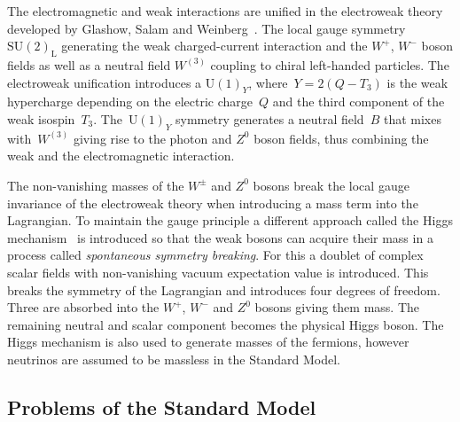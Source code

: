The electromagnetic and weak interactions are unified in the electroweak theory
developed by Glashow, Salam and Weinberg~\cite{glashow, salam, weinberg}. The
local gauge symmetry~$\mathrm{SU}(2)_\text{L}$ generating the weak
charged-current interaction and the $W^+$, $W^-$ boson fields as well as a
neutral field $W^{(3)}$ coupling to chiral left-handed particles. The
electroweak unification introduces a $\mathrm{U}(1)_Y$, where~$Y = 2 (Q - T_3)$
is the weak hypercharge depending on the electric charge~$Q$ and the third
component of the weak isospin~$T_3$. The~$\mathrm{U}(1)_Y$ symmetry generates a
neutral field~$B$ that mixes with~$W^{(3)}$ giving rise to the photon and $Z^0$
boson fields, thus combining the weak and the electromagnetic interaction.

The non-vanishing masses of the $W^\pm$ and $Z^0$ bosons break the local gauge
invariance of the electroweak theory when introducing a mass term into the
Lagrangian. To maintain the gauge principle a different approach called the
Higgs mechanism~\cite{englert_brout, higgs} is introduced so that the weak
bosons can acquire their mass in a process called \emph{spontaneous symmetry
  breaking}. For this a doublet of complex scalar fields with non-vanishing
vacuum expectation value is introduced. This breaks the symmetry of the
Lagrangian and introduces four degrees of freedom. Three are absorbed into the
$W^+$, $W^-$ and $Z^0$ bosons giving them mass. The remaining neutral and scalar
component becomes the physical Higgs boson. The Higgs mechanism is also used to
generate masses of the fermions, however neutrinos are assumed to be massless in
the Standard Model.

\subsection{Problems of the Standard Model}

